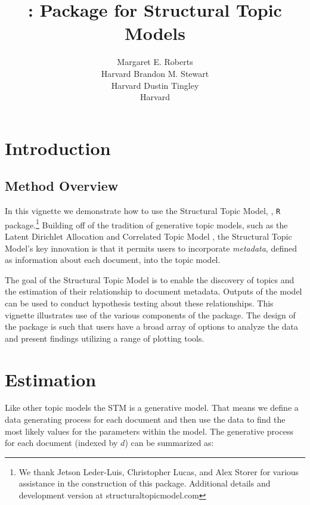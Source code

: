 \documentclass[nojss]{jss}
\author{\hspace{1.1in}Margaret E. Roberts\\\hspace{1.1in}Harvard \And
  \hspace{1.5in}Brandon M. Stewart\\\hspace{1.5in}Harvard \And
  \hspace{1.5in}Dustin Tingley\\\hspace{1.5in}Harvard \And
}
\title{\pkg{stm}: \proglang{R} Package for Structural Topic Models}
\newcommand\spacingset[1]{\renewcommand{\baselinestretch}{#1}\small\normalsize}
\begin{document}

\spacingset{1.5}

\section{Introduction}
\subsection{Method Overview}

In this vignette we demonstrate how to use the Structural Topic Model, , \texttt{R} package.\footnote{We thank Jetson Leder-Luis, Christopher Lucas, and Alex Storer for various assistance in the construction of this package.  Additional details and development version at structuraltopicmodel.com} Building off of the tradition of generative topic models, such as the Latent Dirichlet Allocation \citep{blei2003latent} and Correlated Topic Model \citep{blei2007correlated}, the Structural Topic Model's key innovation is that it permits users to incorporate \emph{metadata}, defined as information about each document, into the topic model.

The goal of the Structural Topic Model is to enable the discovery of topics and the estimation of their relationship to document metadata. Outputs of the model can be used to conduct hypothesis testing about these relationships. This vignette illustrates use of the various components of the package. The design of the package is such that users have a broad array of options to analyze the data and present findings utilizing a range of plotting tools.

\section{Estimation}
Like other topic models the STM is a generative model. That means we define a data generating process for each document and then use the data to find the most likely values for the parameters within the model.  The generative process for each document (indexed by $d$) can be summarized as:
\end{document}
